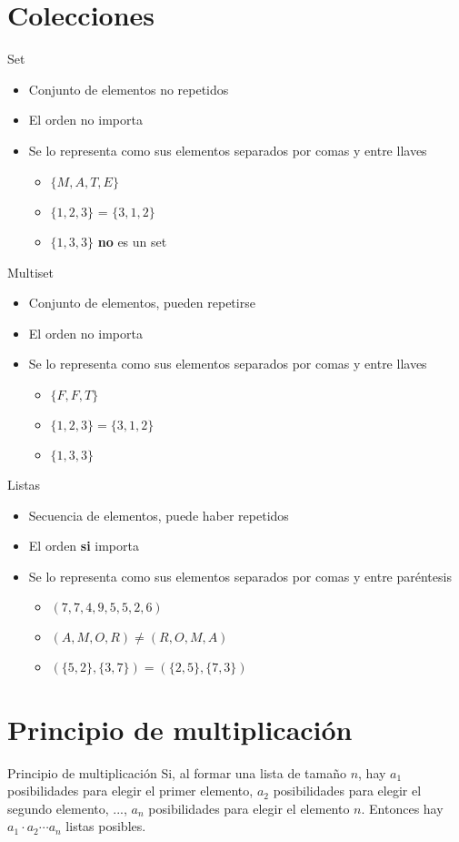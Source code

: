 \documentclass[10pt]{beamer}
\newcommand{\bi}{\begin{itemize}}
\newcommand{\ei}{\end{itemize}}
\begin{document}
\section{Colecciones}

\begin{frame}{Set}
  \bi
    \item Conjunto de elementos no repetidos
    \item El orden no importa
    \item Se lo representa como sus elementos separados por comas y entre llaves
    \bi
      \item $\{M, A, T, E\}$
      \item $\{1, 2, 3\}$ = $\{3, 1, 2\}$
      \item $\{1, 3, 3\}$ \textbf{no} es un set
    \ei
  \ei
\end{frame}

\begin{frame}{Multiset}
  \bi
    \item Conjunto de elementos, pueden repetirse
    \item El orden no importa
    \item Se lo representa como sus elementos separados por comas y entre llaves
    \bi
      \item $\{F, F, T\}$
      \item $\{1, 2, 3\} = \{3, 1, 2\}$
      \item $\{1, 3, 3\}$
    \ei
  \ei
\end{frame}

\begin{frame}{Listas}
  \bi
    \item Secuencia de elementos, puede haber repetidos
    \item El orden \textbf{si} importa
    \item Se lo representa como sus elementos separados por comas y entre paréntesis
    \bi
      \item $(7, 7, 4, 9, 5, 5, 2, 6)$
      \item $(A, M, O, R) \neq (R, O, M, A)$
      \item $(\{5, 2\}, \{3, 7\}) = (\{2, 5\}, \{7, 3\})$
    \ei
  \ei
\end{frame}

\section{Principio de multiplicación}

\begin{frame}{Principio de multiplicación}
  Si, al formar una lista de tamaño $n$, hay $a_1$ posibilidades para elegir el primer elemento,
  $a_2$ posibilidades para elegir el segundo elemento, ..., $a_n$ posibilidades para elegir el 
  elemento $n$. Entonces hay $a_1 \cdot a_2 \cdots a_n$ listas posibles.

  \vspace{20pt}
\end{frame}
\end{document}
